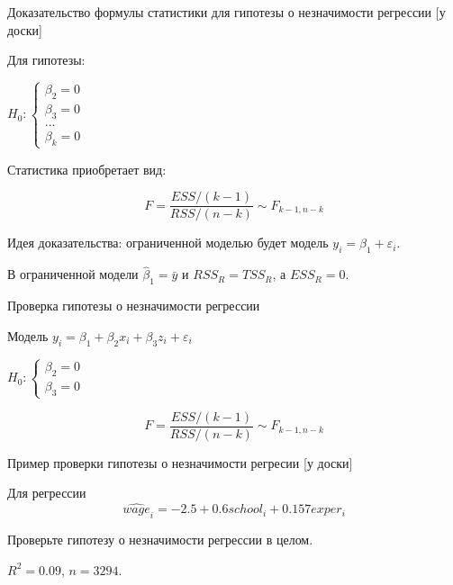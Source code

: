 \documentclass[russian,ignorenonframetext,]{beamer}
\newcommand{\e}{\varepsilon}
\newcommand{\hb}{\hat{\beta}}
\begin{document}
\begin{frame}{Доказательство формулы статистики для гипотезы о
незначимости регрессии {[}у доски{]}}

Для гипотезы:

\(H_0: \begin{cases} \beta_2 =0 \\ \beta_3 = 0 \\ ... \\ \beta_k= 0 \end{cases}\)

Статистика приобретает вид:

\[
F=\frac{ESS/(k-1)}{RSS/(n-k)} \sim F_{k-1, n-k}
\]

Идея доказательства: ограниченной моделью будет модель
\(y_i=\beta_1 + \e_i\).

В ограниченной модели \(\hb_1=\bar{y}\) и \(RSS_R=TSS_R\), а
\(ESS_R=0\).

\end{frame}

\begin{frame}{Проверка гипотезы о незначимости регрессии}

Модель \(y_i = \beta_1 + \beta_2 x_i + \beta_3 z_i + \varepsilon_i\)

\(H_0: \begin{cases} \beta_2 =0 \\ \beta_3 = 0 \end{cases}\)

\[
F=\frac{ESS/(k-1)}{RSS/(n-k)} \sim F_{k-1, n-k}
\]

\end{frame}

\begin{frame}{Пример проверки гипотезы о незначимости регресии {[}у
доски{]}}

Для регрессии \[
\widehat{wage}_i=-2.5+0.6 school_i + 0.157 exper_i
\]

Проверьте гипотезу о незначимости регрессии в целом.

\(R^2=0.09\), \(n=3294\).

\end{frame}
\end{document}

